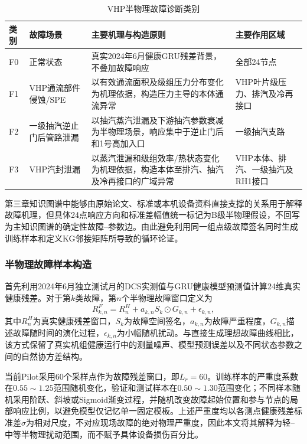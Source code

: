 \begin{table}[htbp]
    \centering
    \caption{VHP半物理故障诊断类别}
    \label{tab:fault_classes_v2}
    \begin{tabular}{p{1.0cm}p{4.2cm}p{5.2cm}p{4.0cm}}
        \toprule
        类别 & 故障场景 & 主要机理与构造原则 & 主要作用区域 \\
        \midrule
        F0 & 正常状态 & 真实2024年6月健康GRU残差背景，不叠加故障响应 & 全部24节点 \\
        F1 & VHP通流部件侵蚀/SPE & 以有效通流面积及级组压力分布变化为机理依据，构造压力主导的本体通流异常 & VHP叶片级压力、排汽及冷再接口 \\
        F2 & 一级抽汽逆止门后管路泄漏 & 以抽汽蒸汽泄漏及下游抽汽参数衰减为半物理场景，响应集中于逆止门后和1号高加入口 & 一级抽汽支路 \\
        F3 & VHP汽封泄漏 & 以蒸汽泄漏和级组效率/热状态变化为机理依据，构造本体至排汽、抽汽及冷再接口的广域异常 & VHP本体、排汽、一级抽汽及RH1接口 \\
        \bottomrule
    \end{tabular}
\end{table}

第三章知识图谱中能够由原始论文、标准或本机设备资料直接支撑的关系用于解释故障机理，但具体24点响应方向和标准差幅值统一标记为B级半物理假设，不回写为主知识图谱的确定性故障--参数边。由此避免利用同一组点级故障签名同时生成训练样本和定义KG邻接矩阵所导致的循环论证。

\subsubsection{半物理故障样本构造}

首先利用2024年6月独立测试月的DCS实测值与GRU健康模型预测值计算24维真实健康残差。对于第$k$类故障，第$n$个半物理故障窗口定义为
\begin{equation}
    R_{k,n}^{F}=R_n^{H}+a_{k,n}S_k\odot G_{k,n}+\epsilon_{k,n},
\end{equation}
其中$R_n^{H}$为真实健康残差窗口，$S_k$为故障空间签名，$a_{k,n}$为故障严重程度，$G_{k,n}$描述故障随时间的演化过程，$\epsilon_{k,n}$为小幅随机扰动。与直接生成理想故障曲线相比，该方式保留了真实机组健康运行中的测量噪声、模型预测误差以及不同状态参数之间的自然协方差结构。

当前Pilot采用60个采样点作为故障残差窗口，即$L_r=60$。训练样本的严重度系数在$0.55\sim1.25$范围随机变化，验证和测试样本在$0.50\sim1.30$范围变化；不同样本随机采用阶跃、斜坡或Sigmoid渐变过程，并随机改变故障起始位置和参与节点的局部响应比例，以避免模型仅记忆单一固定模板。上述严重度均以各测点健康残差标准差$\sigma$为相对尺度，不对应现场故障的绝对物理严重度，因此本文将其解释为轻--中等半物理扰动范围，而不赋予具体设备损伤百分比。

